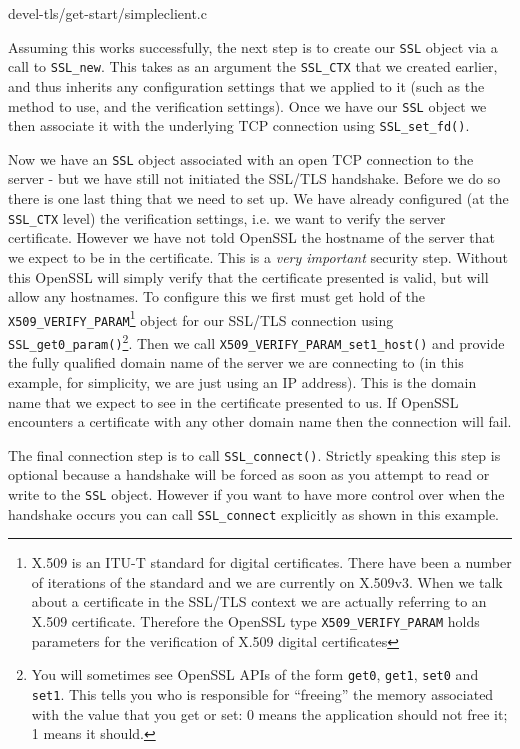 
{devel-tls/get-start/simpleclient.c}

Assuming this works successfully, the next step is to create our \verb!SSL! 
object via a call to \verb!SSL_new!. This takes as an argument the 
\verb!SSL_CTX! that we created earlier, and thus inherits any configuration 
settings that we applied to it (such as the method to use, and the verification 
settings). Once we have our \verb!SSL! object we then associate it with the 
underlying TCP connection using \verb!SSL_set_fd()!.

Now we have an \verb!SSL! object associated with an open TCP connection to the 
server - but we have still not initiated the SSL/TLS handshake. Before we do so 
there is one last thing that we need to set up. We have already configured (at 
the \verb!SSL_CTX! level) the verification settings, i.e. we want to verify the 
server certificate. However we have not told OpenSSL the hostname of the server 
that we expect to be in the certificate. This is a \emph{very important} 
security step. Without this OpenSSL will simply verify that the certificate
presented is valid, but will allow any hostnames. To configure this we first 
must get hold of the \verb!X509_VERIFY_PARAM!\footnote{X.509 is an ITU-T 
standard for digital certificates. There have been a number of iterations of 
the standard and we are currently on X.509v3. When we talk about a certificate 
in the SSL/TLS context we are actually referring to an X.509 certificate. 
Therefore the OpenSSL type \texttt{X509\_VERIFY\_PARAM} holds parameters for the 
verification of X.509 digital certificates} object for our SSL/TLS connection 
using \verb!SSL_get0_param()!\footnote{You will sometimes see OpenSSL APIs of 
the form \texttt{get0}, \texttt{get1}, \texttt{set0} and \texttt{set1}. This
tells you  who is responsible for ``freeing'' the memory associated with the
value that  you get or set: 0 means the application should not free it; 1 means
it should.}. Then we call \verb!X509_VERIFY_PARAM_set1_host()! and provide the 
fully qualified domain name of the server we are connecting to (in this 
example, for simplicity, we are just using an IP address). This is the domain
name that  we expect to see in the certificate presented to us. If OpenSSL
encounters a certificate with any other domain name then the connection will
fail.

The final connection step is to call \verb!SSL_connect()!. Strictly speaking
this step is optional because a handshake will be forced as soon as you attempt
to read or write to the \verb!SSL! object. However if you want to have more 
control over when the handshake occurs you can call \verb!SSL_connect! 
explicitly as shown in this example.

